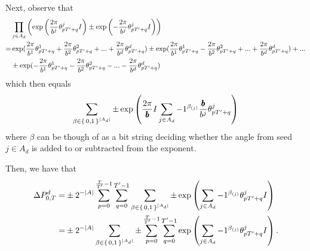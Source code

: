 \newcommand{\periodFrac}{\frac{\totalPeriod}{\rationalPeriod}}
\newcommand{\periodFracRational}{\frac{\rationalPeriodTotal}{\rationalPeriod}}

Next, observe that 
\begin{align*}
  &\prod_{j \in A_d} \left(
      \exp\left(\numbToAngle\rationalAngle{p \rationalPeriodTotal + q} I\right) \pm  \exp\left(-\numbToAngle\rationalAngle{p \rationalPeriodTotal + q} I\right)\right)\\
 =& 
  \exp(\numbToAngleNoJ{1}\rationalAngleJ{p \rationalPeriodTotal + q}{1} + \numbToAngleNoJ{2}\rationalAngleJ{p \rationalPeriodTotal + q}{2} + ... + \numbToAngleNoJ{d}\rationalAngleJ{p \rationalPeriodTotal + q}{d}) 
  \pm \exp(\numbToAngleNoJ{1}\rationalAngleJ{p \rationalPeriodTotal + q}{1} - \numbToAngleNoJ{2}\rationalAngleJ{p \rationalPeriodTotal + q}{2} + ... + \numbToAngleNoJ{d}\rationalAngleJ{p \rationalPeriodTotal + q}{d}) + ... \\
  &\pm \exp(-\numbToAngleNoJ{1}\rationalAngleJ{p \rationalPeriodTotal + q}{1} - \numbToAngleNoJ{2}\rationalAngleJ{p \rationalPeriodTotal + q}{2} - ... - \numbToAngleNoJ{d}\rationalAngleJ{p \rationalPeriodTotal + q}{d})
\end{align*}
which then equals
\begin{equation}
 \sum_{\beta \in \set{0,1}^{|A_d|}} 
		\pm
    \exp\left(
      	\commonToAngle I
        \sum_{j \in A_d} -1 ^ {\beta_{(j)}}
          \numbToCommon \rationalAngle{p \rationalPeriodTotal + q}
      \right)
\end{equation}
where $\beta$ can be though of as a bit string deciding whether the angle from seed
$j \in A_d$ is added to or subtracted from the exponent.

Then, we have that
\begin{align*}
 \changeTotalOneDim =&
  \pm 2^{-|A|} \sum_{p= 0}^{\frac{\totalPeriod}{\rationalPeriodTotal} - 1} \sum_{q = 0}^{\rationalPeriodTotal - 1}
 \sum_{\beta \in \set{0,1}^{|A_d|}} 
 	 \pm
    \exp\left(
        \sum_{j \in A_d} -1 ^ {\beta_{(j)}}
        \rationalAngle{p \rationalPeriodTotal + q}I
      \right)\\
 =&
  \pm 2^{-|A|} 
 \sum_{\beta \in \set{0,1}^{|A_d|}} 
		\pm
     \sum_{p= 0}^{\frac{\totalPeriod}{\rationalPeriodTotal} - 1} \sum_{q = 0}^{\rationalPeriodTotal - 1}
    \exp\left(
        \sum_{j \in A_d} -1 ^ {\beta_{(j)}}
        \rationalAngle{p \rationalPeriodTotal + q}I
      \right).
\end{align*}

